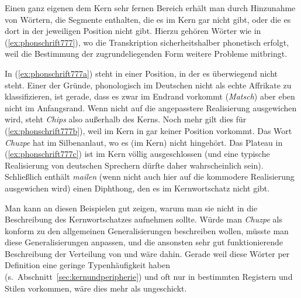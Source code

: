 \Np

Einen ganz eigenen dem Kern sehr fernen Bereich erhält man durch Hinzunahme von Wörtern, die Segmente enthalten, die es im Kern gar nicht gibt, oder die es dort in der jeweiligen Position nicht gibt.
Hierzu gehören Wörter wie in (\ref{ex:phonschrift777}), wo die Transkription sicherheitshalber phonetisch erfolgt, weil die Bestimmung der zugrundeliegenden Form weitere Probleme mitbringt.

\begin{exe}
  \ex\label{ex:phonschrift777}
  \begin{xlist}
  \end{xlist}
\end{exe}

In (\ref{ex:phonschrift777a}) steht \textipa{[\t{tS}]} in einer Position, in der es überwiegend nicht steht.
Einer der Gründe, phonologisch \textipa{[\t{tS}]} im Deutschen nicht als echte Affrikate zu klassifizieren, ist gerade, dass es zwar im Endrand vorkommt (\textit{Matsch}) aber eben nicht im Anfangsrand.
Wenn nicht auf die angepasstere Realisierung \textipa{[SIps]} ausgewichen wird, steht \textit{Chips} also außerhalb des Kerns.
Noch mehr gilt dies für (\ref{ex:phonschrift777b}), weil \textipa{[\t{dZ}]} im Kern in gar keiner Position vorkommt.
Das Wort \textit{Chuzpe} hat \textipa{[X]} im Silbenanlaut, wo es (im Kern) nicht hingehört.
Das Plateau \textipa{[pt]} in (\ref{ex:phonschrift777c}) ist im Kern völlig ausgeschlossen (und eine typische Realisierung von deutschen Sprechern dürfte daher wahrscheinlich \textipa{[p@tEKanodOn]} sein).
Schließlich enthält \textit{mailen} (wenn nicht auch hier auf die kommodere Realisierung \textipa{[me:l@n]} ausgewichen wird) einen Diphthong, den es im Kernwortschatz nicht gibt.

Man kann an diesen Beispielen gut zeigen, warum man sie nicht in die Beschreibung des Kernwortschatzes aufnehmen sollte.
Würde man \textit{Chuzpe} \zB als konform zu den allgemeinen Generalisierungen beschreiben wollen, müsste man diese Generalisierungen anpassen, und die ansonsten sehr gut funktionierende Beschreibung der Verteilung von \textipa{[\c{c}]} und \textipa{[X]} wäre dahin.
Gerade weil diese Wörter per Definition eine geringe Typenhäufigkeit haben (s.\ Abschnitt~\ref{sec:kernundperipherie}) und oft nur in bestimmten Registern und Stilen vorkommen, wäre dies mehr als ungeschickt.

